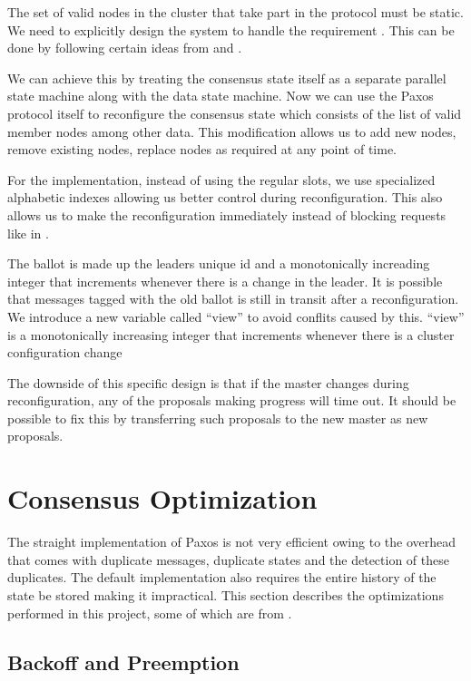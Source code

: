 The set of valid nodes in the cluster that take part in the protocol must
be static. We need to explicitly design the system to handle the requirement
. This can be done by following certain
ideas from \citet{LamportSP08} and \citet{LamportMZ10}.

We can achieve this by treating the consensus state itself as a separate
parallel state machine along with the data state machine. Now we can use
the Paxos protocol itself to reconfigure the consensus state which consists
of the list of valid member nodes among other data. This modification allows
us to add new nodes, remove existing nodes, replace nodes as required at any
point of time.

For the implementation, instead of using the regular slots, we use specialized
alphabetic indexes allowing us better control during reconfiguration. This also
allows us to make the reconfiguration immediately instead of blocking requests
like in \citet{LamportSP08}.

The ballot is made up the leaders unique id and a monotonically increading 
integer that increments whenever there is a change in the leader. It is possible
that messages tagged with the old ballot is still in transit after a 
reconfiguration. We introduce a new variable called ``view'' to avoid conflits 
caused by this. ``view'' is a monotonically increasing integer that increments
whenever there is a cluster configuration change

The downside of this specific design is that if the master changes during
reconfiguration, any of the proposals making progress will time out. It
should be possible to fix this by transferring such proposals to the new master
as new proposals.

\section{Consensus Optimization}

The straight implementation of Paxos is not very efficient owing to the overhead
that comes with duplicate messages, duplicate states and the detection of these
duplicates. The default implementation also requires the entire history of the
state be stored making it impractical. This section describes the optimizations
performed in this project, some of which are from \citet{Robbert2011}.

\subsection{Backoff and Preemption}


